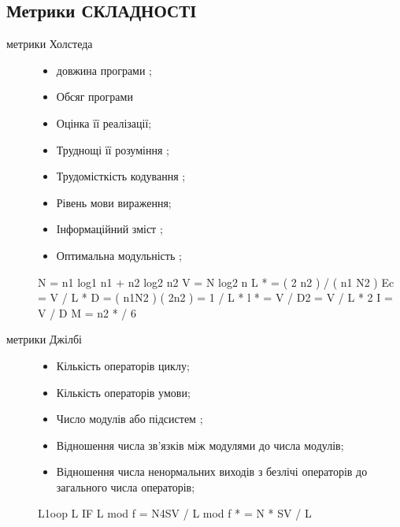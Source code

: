 \documentclass[oneside,final,14pt]{extreport}
\begin{document}
\subsection{Метрики СКЛАДНОСТІ}
\label{2section:id7}\begin{description}
\item[{метрики Холстеда}] \leavevmode\begin{itemize}
\item {} 
довжина програми ;

\item {} 
Обсяг програми

\item {} 
Оцінка її реалізації;

\item {} 
Труднощі її розуміння ;

\item {} 
Трудомісткість кодування ;

\item {} 
Рівень мови вираження;

\item {} 
Інформаційний зміст ;

\item {} 
Оптимальна модульність ;

\end{itemize}

N = n1 log1 n1 + n2 log2 n2
V = N log2 n
L * = ( 2 n2 ) / ( n1 N2 )
Ec = V / L *
D = ( n1N2 ) ( 2n2 ) = 1 / L *
l * = V / D2 = V / L * 2
I = V / D
M = n2 * / 6

\item[{метрики Джілбі}] \leavevmode\begin{itemize}
\item {} 
Кількість операторів циклу;

\item {} 
Кількість операторів умови;

\item {} 
Число модулів або підсистем ;

\item {} 
Відношення числа зв'язків між модулями до числа модулів;

\item {} 
Відношення числа ненормальних виходів з безлічі операторів до загального числа операторів;

\end{itemize}

L1oop
L IF
L mod
f = N4SV / L mod
f * = N * SV / L


\end{description}
\end{document}
